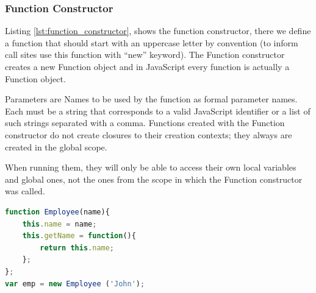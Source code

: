 \noindent\subsubsection{Function Constructor}

Listing \ref{lst:function_constructor}, shows the function constructor, there we define a function that should start with an uppercase letter by convention (to inform call sites use this function with “new” keyword). The Function constructor creates a new Function object and in JavaScript every function is actually a Function object.

Parameters are Names to be used by the function as formal parameter names. Each must be a string that corresponds to a valid JavaScript identifier or a list of such strings separated with a comma. Functions created with the Function constructor do not create closures to their creation contexts; they always are created in the global scope.

When running them, they will only be able to access their own local variables and global ones, not the ones from the scope in which the Function constructor was called.

\begin{lstlisting}[caption={Function constructor},label={lst:function_constructor},language=JavaScript] 
function Employee(name){
	this.name = name;
	this.getName = function(){
		return this.name;
	};	
};
var emp = new Employee ('John');
\end{lstlisting}
